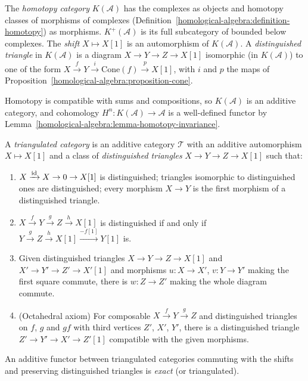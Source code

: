\begin{definition}\label{derived-categories:definition-homotopy-category}
The \emph{homotopy category} $K(\mathcal{A})$ has the complexes as objects and homotopy classes of morphisms of complexes
(Definition~\ref{homological-algebra:definition-homotopy}) as morphisms. $K^+(\mathcal{A})$ is its full subcategory of bounded
below complexes. The \emph{shift} $X \mapsto X[1]$ is an automorphism of $K(\mathcal{A})$. A \emph{distinguished triangle} in
$K(\mathcal{A})$ is a diagram $X \to Y \to Z \to X[1]$ isomorphic (in $K(\mathcal{A})$) to one of the form
$X \xrightarrow{f} Y \xrightarrow{i} \mathrm{Cone}(f) \xrightarrow{p} X[1]$, with $i$ and $p$ the maps of
Proposition~\ref{homological-algebra:proposition-cone}.
\end{definition}

\begin{remark}\label{derived-categories:remark-homotopy-well-defined}
Homotopy is compatible with sums and compositions, so $K(\mathcal{A})$ is an additive category, and cohomology
$H^n \colon K(\mathcal{A}) \to \mathcal{A}$ is a well-defined functor by Lemma~\ref{homological-algebra:lemma-homotopy-invariance}.
\end{remark}

\begin{definition}\label{derived-categories:definition-triangulated}
A \emph{triangulated category} is an additive category $\mathcal{T}$ with an additive automorphism $X \mapsto X[1]$ and a class of
\emph{distinguished triangles} $X \to Y \to Z \to X[1]$ such that:
\begin{enumerate}
\item[(TR1)] $X \xrightarrow{\mathrm{id}} X \to 0 \to X[1]$ is distinguished; triangles isomorphic to distinguished ones are distinguished;
every morphism $X \to Y$ is the first morphism of a distinguished triangle.
\item[(TR2)] $X \xrightarrow{f} Y \xrightarrow{g} Z \xrightarrow{h} X[1]$ is distinguished if and only if
$Y \xrightarrow{g} Z \xrightarrow{h} X[1] \xrightarrow{-f[1]} Y[1]$ is.
\item[(TR3)] Given distinguished triangles $X \to Y \to Z \to X[1]$ and $X' \to Y' \to Z' \to X'[1]$ and morphisms $u \colon X \to X'$,
$v \colon Y \to Y'$ making the first square commute, there is $w \colon Z \to Z'$ making the whole diagram commute.
\item[(TR4)] (Octahedral axiom) For composable $X \xrightarrow{f} Y \xrightarrow{g} Z$ and distinguished triangles on $f$, $g$ and $gf$ with
third vertices $Z'$, $X'$, $Y'$, there is a distinguished triangle $Z' \to Y' \to X' \to Z'[1]$ compatible with the given
morphisms.
\end{enumerate}
An additive functor between triangulated categories commuting with the shifts and preserving distinguished triangles is
\emph{exact} (or triangulated).
\end{definition}

